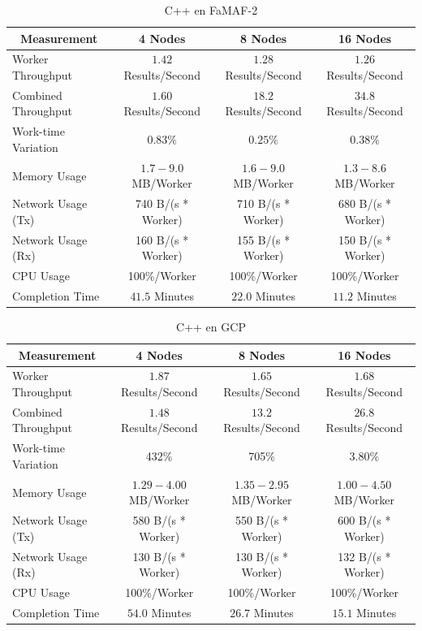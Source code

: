 \documentclass[11pt]{article}
\begin{document}
\begin{table}[H]
\centering
\begin{tabular}{|l|c|c|c|}
\hline
\multicolumn{1}{|c|}{Measurement} & 4 Nodes & 8 Nodes & 16 Nodes \\ \hline
Worker Throughput & $1.42$ Results/Second & $1.28$ Results/Second & $1.26$ Results/Second \\ \hline
Combined Throughput & $1.60$ Results/Second & $18.2$ Results/Second & $34.8$ Results/Second \\ \hline
Work-time Variation & $0.83\%$& $0.25\%$& $0.38\%$\\ \hline
Memory Usage & $1.7-9.0$ MB/Worker & $1.6-9.0$ MB/Worker & $1.3-8.6$ MB/Worker \\ \hline
Network Usage (Tx) & 740 B/(s * Worker) & 710 B/(s * Worker) & 680 B/(s * Worker) \\ \hline
Network Usage (Rx) & 160 B/(s * Worker) & 155 B/(s * Worker) & 150 B/(s * Worker) \\ \hline
CPU Usage & 100\%/Worker & 100\%/Worker & 100\%/Worker \\ \hline
Completion Time & $41.5$ Minutes & $22.0$ Minutes & $11.2$ Minutes \\ \hline
\end{tabular}
\caption{C++ en FaMAF-2}
\end{table}

\begin{table}[H]
\centering
\begin{tabular}{|l|c|c|c|}
\hline
\multicolumn{1}{|c|}{Measurement} & 4 Nodes & 8 Nodes & 16 Nodes \\ \hline
Worker Throughput & $1.87$ Results/Second & $1.65$ Results/Second & $1.68$ Results/Second \\ \hline
Combined Throughput & $1.48$ Results/Second & $13.2$  Results/Second & $26.8$ Results/Second \\ \hline
Work-time Variation & 432\% & 705\% & $3.80\%$\\ \hline
Memory Usage & $1.29-4.00$ MB/Worker & $1.35-2.95$ MB/Worker & $1.00-4.50$ MB/Worker \\ \hline
Network Usage (Tx) & 580 B/(s * Worker) & 550 B/(s * Worker) & 600 B/(s * Worker) \\ \hline
Network Usage (Rx) & 130 B/(s * Worker) & 130 B/(s * Worker) & 132 B/(s * Worker) \\ \hline
CPU Usage & 100\%/Worker & 100\%/Worker & 100\%/Worker \\ \hline
Completion Time & $54.0$ Minutes & $26.7$ Minutes & $15.1$ Minutes \\ \hline
\end{tabular}
\caption{C++ en GCP}
\end{table}
\end{document}
